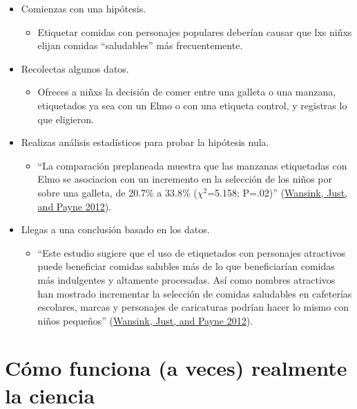 \documentclass[
  12pt,
]{book}
\providecommand{\tightlist}{%
  \setlength{\itemsep}{0pt}\setlength{\parskip}{0pt}}
\begin{document}
\begin{itemize}
\tightlist
\item
  Comienzas con una hipótesis.

  \begin{itemize}
  \tightlist
  \item
    Etiquetar comidas con personajes populares deberían causar que lxs niñxs elijan comidas ``saludables'' más frecuentemente.
  \end{itemize}
\item
  Recolectas algunos datos.

  \begin{itemize}
  \tightlist
  \item
    Ofreces a niñxs la decisión de comer entre una galleta o una manzana, etiquetados ya sea con un Elmo o con una etiqueta control, y registras lo que eligieron.
  \end{itemize}
\item
  Realizas análisis estadísticos para probar la hipótesis nula.

  \begin{itemize}
  \tightlist
  \item
    ``La comparación preplaneada muestra que las manzanas etiquetadas con Elmo se asociacion con un incremento en la selección de los niños por sobre una galleta, de 20.7\% a 33.8\% (\(\chi^2\)=5.158; P=.02)'' (\protect\hyperlink{ref-wans:just:payn:2012}{Wansink, Just, and Payne 2012}).
  \end{itemize}
\item
  Llegas a una conclusión basado en los datos.

  \begin{itemize}
  \tightlist
  \item
    ``Este estudio sugiere que el uso de etiquetados con personajes atractivos puede beneficiar comidas salubles más de lo que beneficiarían comidas más indulgentes y altamente procesadas. Así como nombres atractivos han mostrado incrementar la selección de comidas saludables en cafeterías escolares, marcas y personajes de caricaturas podrían hacer lo mismo con niños pequeños'' (\protect\hyperlink{ref-wans:just:payn:2012}{Wansink, Just, and Payne 2012}).
  \end{itemize}
\end{itemize}

\hypertarget{cuxf3mo-funciona-a-veces-realmente-la-ciencia}{%
\section{Cómo funciona (a veces) realmente la ciencia}\label{cuxf3mo-funciona-a-veces-realmente-la-ciencia}}
\end{document}
